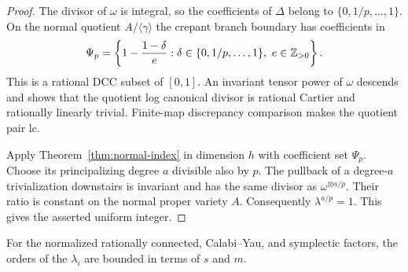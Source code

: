 \begin{proof}
The divisor of $\omega$ is integral, so the coefficients of $\Delta$
belong to $\{0,1/p,\ldots,1\}$. On the normal quotient
$A/\langle\gamma\rangle$ the crepant branch boundary has coefficients in
\[
 \Psi_p=
 \left\{1-\frac{1-\delta}{e}:
       \delta\in\{0,1/p,\ldots,1\},\ e\in\mathbb Z_{>0}\right\}.
\]
This is a rational DCC subset of $[0,1]$. An invariant tensor power
of $\omega$ descends and shows that the quotient log canonical divisor
is rational Cartier and rationally linearly trivial. Finite-map
discrepancy comparison makes the quotient pair lc.

Apply Theorem~\ref{thm:normal-index} in dimension $h$ with coefficient
set $\Psi_p$. Choose its principalizing degree $a$ divisible also by
$p$. The pullback of a degree-$a$ trivialization downstairs is invariant
and has the same divisor as $\omega^{\otimes a/p}$. Their ratio is
constant on the normal proper variety $A$. Consequently
$\lambda^{a/p}=1$. This gives the asserted uniform integer.
\end{proof}

\begin{lemma}\label{lem:other-characters}
For the normalized rationally connected, Calabi--Yau, and symplectic
factors, the orders of the $\lambda_i$ are bounded in terms of $s$ and $m$.
\end{lemma}

